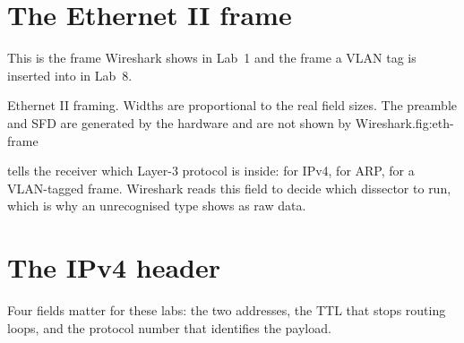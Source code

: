 \section*{The Ethernet II frame}
This is the frame Wireshark shows in Lab~1 and the frame a VLAN tag is
inserted into in Lab~8.

\begin{utpfig}{Ethernet II framing. Widths are proportional to the
real field sizes. The preamble and SFD are generated by the hardware and are not
shown by Wireshark.}{fig:eth-frame}
\end{utpfig}

\begin{keyidea}
 tells the receiver which Layer-3 protocol is inside:
 for IPv4,  for ARP,  for a
VLAN-tagged frame. Wireshark reads this field to decide which dissector
to run, which is why an unrecognised type shows as raw data.
\end{keyidea}

\section*{The IPv4 header}
Four fields matter for these labs: the two addresses, the TTL that stops
routing loops, and the protocol number that identifies the payload.

